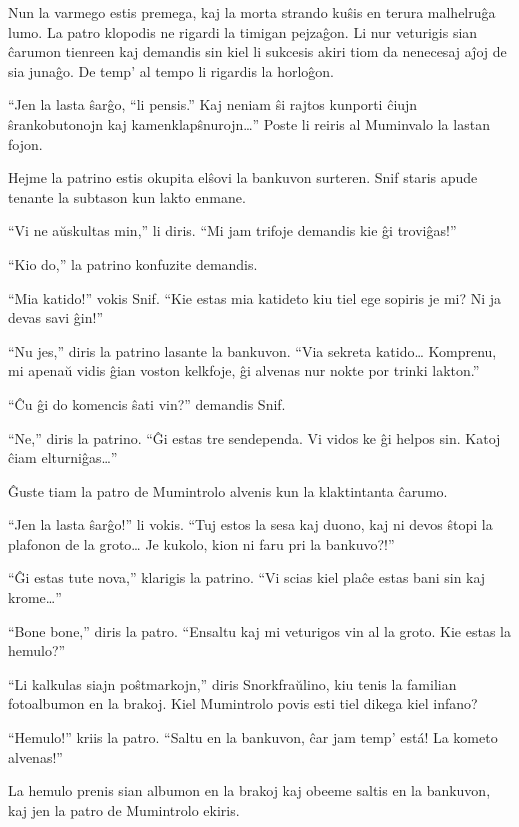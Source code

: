 Nun la varmego estis premega, kaj la morta strando kuŝis en terura malhelruĝa lumo. La patro klopodis ne rigardi la timigan pejzaĝon. Li nur veturigis sian ĉarumon tienreen kaj demandis sin kiel li sukcesis akiri tiom da nenecesaj aĵoj de sia junaĝo. De temp' al tempo li rigardis la horloĝon.

``Jen la lasta ŝarĝo, ``li pensis.'' Kaj neniam ŝi rajtos kunporti ĉiujn ŝrankobutonojn kaj kamenklapŝnurojn{\ldots}'' Poste li reiris al Muminvalo la lastan fojon.

\sectionbreak

Hejme la patrino estis okupita elŝovi la bankuvon surteren. Snif staris apude tenante la subtason kun lakto enmane.

``Vi ne aŭskultas min,'' li diris. ``Mi jam trifoje demandis kie ĝi troviĝas!''

``Kio do,'' la patrino konfuzite demandis.

``Mia katido!'' vokis Snif. ``Kie estas mia katideto kiu tiel ege sopiris je mi? Ni ja devas savi ĝin!''

``Nu jes,'' diris la patrino lasante la bankuvon. ``Via sekreta katido{\ldots} Komprenu, mi apenaŭ vidis ĝian voston kelkfoje, ĝi alvenas nur nokte por trinki lakton.''

``Ĉu ĝi do komencis ŝati vin?'' demandis Snif.

``Ne,'' diris la patrino. ``Ĝi estas tre sendependa. Vi vidos ke ĝi helpos sin. Katoj ĉiam elturniĝas{\ldots}''

Ĝuste tiam la patro de Mumintrolo alvenis kun la klaktintanta ĉarumo.

``Jen la lasta ŝarĝo!'' li vokis. ``Tuj estos la sesa kaj duono, kaj ni devos ŝtopi la plafonon de la groto{\ldots} Je kukolo, kion ni faru pri la bankuvo?!''

``Ĝi estas tute nova,'' klarigis la patrino. ``Vi scias kiel plaĉe estas bani sin kaj krome{\ldots}''

``Bone bone,'' diris la patro. ``Ensaltu kaj mi veturigos vin al la groto. Kie estas la hemulo?''

``Li kalkulas siajn poŝtmarkojn,'' diris Snorkfraŭlino, kiu tenis la familian fotoalbumon en la brakoj. Kiel Mumintrolo povis esti tiel dikega kiel infano?

``Hemulo!'' kriis la patro. ``Saltu en la bankuvon, ĉar jam temp' está! La kometo alvenas!''

La hemulo prenis sian albumon en la brakoj kaj obeeme saltis en la bankuvon, kaj jen la patro de Mumintrolo ekiris.

